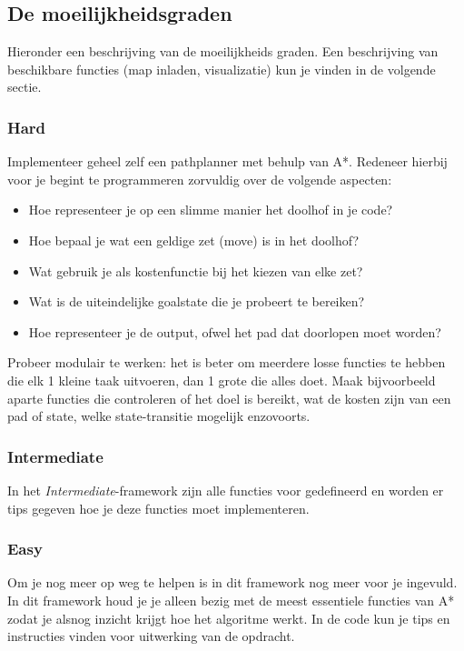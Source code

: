 \documentclass[a4paper]{article}
\begin{document}
\subsection{De moeilijkheidsgraden}
Hieronder een beschrijving van de moeilijkheids graden. Een beschrijving van beschikbare functies (map inladen, visualizatie) kun je vinden in de volgende sectie.

\subsubsection{Hard}
Implementeer geheel zelf een pathplanner met behulp van A*. Redeneer hierbij voor je begint te programmeren zorvuldig over de volgende aspecten:
\begin{itemize}
\item Hoe representeer je op een slimme manier het doolhof in je code?
\item Hoe bepaal je wat een geldige zet (move) is in het doolhof?
\item Wat gebruik je als kostenfunctie bij het kiezen van elke zet?
\item Wat is de uiteindelijke goalstate die je probeert te bereiken?
\item Hoe representeer je de output, ofwel het pad dat doorlopen moet worden? 
\end{itemize}

Probeer modulair te werken: het is beter om meerdere losse functies te hebben die elk 1 kleine taak uitvoeren, dan 1 grote die alles doet. Maak bijvoorbeeld aparte functies die controleren of het doel is bereikt, wat de kosten zijn van een pad of state, welke state-transitie mogelijk enzovoorts. 

\subsubsection{Intermediate}
In het \textit{Intermediate}-framework zijn alle functies voor gedefineerd en worden er tips gegeven hoe je deze functies moet implementeren.

\subsubsection{Easy}
Om je nog meer op weg te helpen is in dit framework nog meer voor je ingevuld. In dit framework houd je je alleen bezig met de meest essentiele functies van A* zodat je alsnog inzicht krijgt hoe het algoritme werkt. In de code kun je tips en instructies vinden voor uitwerking van de opdracht.
\end{document}
